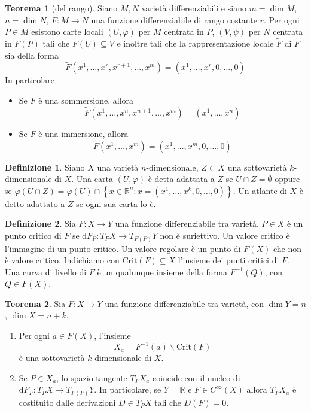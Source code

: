 \documentclass[a4paper,11pt]{article}
\theoremstyle{definition}
\newtheorem{definizione}{Definizione}[section]
\theoremstyle{theorem}
\newtheorem{teorema}{Teorema}[section]
\newcommand{\crit}[1]{\mathrm{Crit}(#1)}
\begin{document}
\begin{teorema}[del rango]
	Siano $M,N$ varietà differenziabili e siano $m=\dim M$, $n=\dim N$, $F\colon M\to N$ una funzione differenziabile di rango costante $r$. Per ogni $P\in M$ esistono carte locali $(U,\varphi)$ per $M$ centrata in $P$, $(V,\psi)$ per $N$ centrata in $F(P)$ tali che $F(U)\subseteq V$ e inoltre tali che la rappresentazione locale $\tilde{F}$ di $F$ sia della forma
	\[\tilde{F}(x^1,\dots,x^r,x^{r+1},\dots,x^m)=(x^1,\dots,x^r,0,\dots,0)\]
	In particolare
	\begin{itemize}
		\item Se $F$ è una sommersione, allora 
		\[\tilde{F}(x^1,\dots,x^n,x^{n+1},\dots,x^m)=(x^1,\dots,x^n)\]
		\item Se $F$ è una immersione, allora
		\[\tilde{F}(x^1,\dots,x^m)=(x^1,\dots,x^m,0,\dots,0)\]
		
	\end{itemize}
\end{teorema}
\begin{definizione}
	Siano $X$ una varietà $n$-dimensionale, $Z\subset X$ una sottovarietà $k$-dimensionale di $X$. Una carta $(U,\varphi)$ è detta adattata a $Z$ se $U\cap Z=\emptyset$ oppure se $\varphi(U\cap Z)=\varphi(U)\cap\left\{x\in\mathbb{R}^n:x=(x^1,\dots,x^k,0,\dots,0)\right\}$. Un atlante di $X$ è detto adattato a $Z$ se ogni sua carta lo è.
\end{definizione}
\begin{definizione}
	Sia $F\colon X\to Y$ una funzione differenziabile tra varietà. $P\in X$ è un punto critico di $F$ se $\mathrm{d}F_P\colon T_PX\to T_{F(P)}Y$ non è suriettivo. Un valore critico è l'immagine di un punto critico. Un valore regolare è un punto di $F(X)$ che non è valore critico. Indichiamo con $\crit{F}\subseteq X$ l'insieme dei punti critici di $F$. Una curva di livello di $F$ è un qualunque insieme della forma $F^{-1}(Q)$, con $Q\in F(X)$.
\end{definizione}
\begin{teorema}
	Sia $F\colon X\to Y$ una funzione differenziabile tra varietà, con $\dim Y=n$, $\dim X=n+k$.
	\begin{enumerate}
		\item Per ogni $a\in F(X)$, l'insieme
		\[X_a=F^{-1}(a)\backslash\crit{F}\]
		è una sottovarietà $k$-dimensionale di $X$.
		\item Se $P\in X_a$, lo spazio tangente $T_PX_a$ coincide con il nucleo di $\mathrm{d}F_P\colon T_PX\to T_{F(P)}Y$. In particolare, se $Y=\mathbb{R}$ e $F\in C^\infty(X)$ allora $T_PX_a$ è costituito dalle derivazioni $D\in T_PX$ tali che $D(F)=0$.
	\end{enumerate}
\end{teorema}
\end{document}
